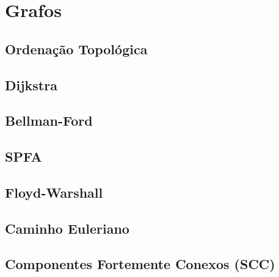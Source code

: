 % 


\section{Grafos}

\subsection{Ordenação Topológica}


\subsection{Dijkstra}


\subsection{Bellman-Ford}


\subsection{SPFA}


\subsection{Floyd-Warshall}


\subsection{Caminho Euleriano}


% 

\subsection{Componentes Fortemente Conexos (SCC)}


